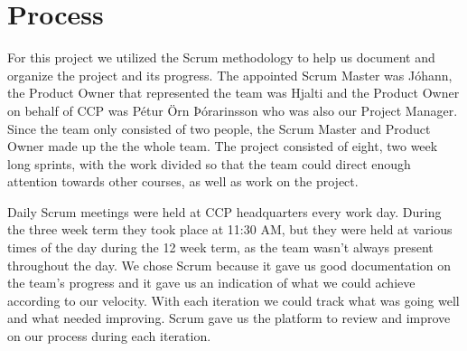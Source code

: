 \section{Process}\label{sec:process}
For this project we utilized the Scrum methodology to help us document and organize the project and its progress. The appointed Scrum Master was Jóhann, the Product Owner that represented the team was Hjalti and the Product Owner on behalf of CCP was Pétur Örn Þórarinsson who was also our Project Manager. Since the team only consisted of two people, the Scrum Master and Product Owner made up the the whole team. The project consisted of eight, two week long sprints, with the work divided so that the team could direct enough attention towards other courses, as well as work on the project.

Daily Scrum meetings were held at CCP headquarters every work day. During the three week term they took place at 11:30 AM, but they were held at various times of the day during the 12 week term, as the team wasn't always present throughout the day. We chose Scrum because it gave us good documentation on the team's progress and it gave us an indication of what we could achieve according to our velocity. With each iteration we could track what was going well and what needed improving. Scrum gave us the platform to review and improve on our process during each iteration.
